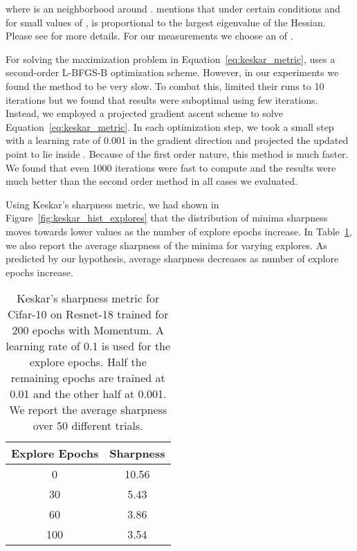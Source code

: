 \documentclass[twoside,11pt]{article}
\begin{document}
where  is an  neighborhood around . \cite{keskar2016large} mentions that under certain conditions and for small values of ,  is proportional to the largest eigenvalue of the Hessian. Please see \cite{keskar2016large} for more details. For our measurements we choose an  of .

For solving the maximization problem in Equation~\ref{eq:keskar_metric}, \cite{keskar2016large} uses a second-order L-BFGS-B \citep{byrd-lbgfs} optimization scheme. However, in our experiments we found the method to be very slow. To combat this, \cite{keskar2016large} limited their runs to 10 iterations but we found that results were suboptimal using few iterations. Instead, we employed a projected gradient ascent scheme to solve Equation~\ref{eq:keskar_metric}. In each optimization step, we took a small step with a learning rate of 0.001 in the gradient direction and projected the updated point to lie inside . Because of the first order nature, this method is much faster. We found that even 1000 iterations were fast to compute and the results were much better than the second order method in all cases we evaluated.










Using Keskar's sharpness metric, we had shown in Figure~\ref{fig:keskar_hist_explores} that the distribution of minima sharpness moves towards lower values as the number of explore epochs increase. In Table~\ref{tab:keskar_avg}, we also report the average sharpness of the minima for varying explores. As predicted by our hypothesis, average sharpness decreases as number of explore epochs increase.

\begin{table}[hbt!]
\begin{minipage}{.6\textwidth}
    \caption{Keskar's sharpness metric for Cifar-10 on Resnet-18 trained for 200 epochs with Momentum. A learning  rate of 0.1 is used for the explore epochs. Half the remaining epochs are trained at 0.01 and the other half at 0.001. We report the average sharpness over 50 different trials.}
\label{tab:keskar_avg}
\end{minipage}\hfill
\begin{minipage}{.35\textwidth}\vspace*{-14pt}\begin{tabular}{cc}
  \toprule
  Explore Epochs       &  Sharpness \\
\midrule
  0 & 10.56\\
  30 & 5.43\\
  60 & 3.86\\
  100 & 3.54\\
 \bottomrule
\end{tabular}
\end{minipage}
\end{table}
\vspace{-15pt}
\end{document}
